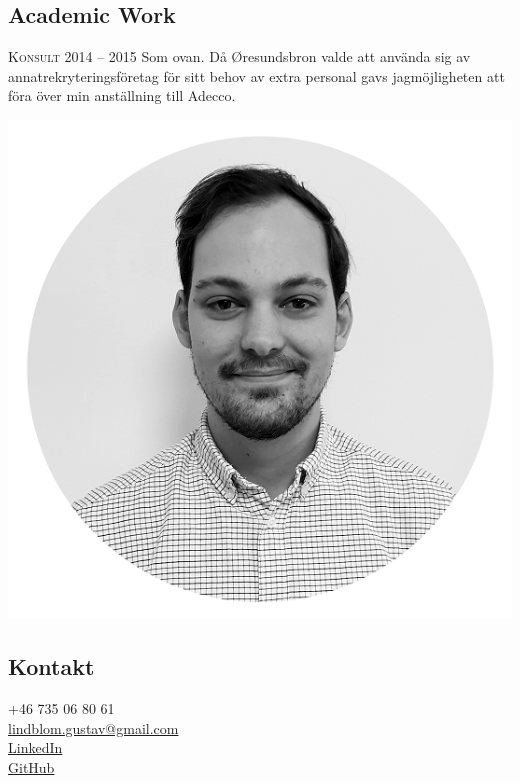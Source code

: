 \documentclass[usenames,dvipsnames]{article}
\begin{document}
\begin{minipage}[t]{0.65\textwidth}
\subsection*{\textcolor{NavyBlue}{Academic Work}}
\begin{flushleft}
\textsc{Konsult 2014 -- 2015}\break
Som ovan. Då Øresundsbron valde att använda sig av annatrekryteringsföretag för sitt behov av extra personal gavs jagmöjligheten att föra över min anställning till Adecco.
\end{flushleft}

\end{minipage}
\hspace{1.6cm}\begin{minipage}[t]{0.4\textwidth}
\vspace{0cm}
\begin{flushleft}
\begin{center}
\noindent\includegraphics[scale=0.25]{gustavlindblom}
\end{center}
\subsection*{\textcolor{NavyBlue}{Kontakt}}

\faPhone \qquad +46 735 06 80 61\\
\faEnvelope \qquad \href{mailto:lindblom.gustav@gmail.com}{lindblom.gustav@gmail.com}\\
\faLinkedin \qquad \href{https://www.linkedin.com/in/gustav-lindblom-a1529912a/}{LinkedIn}\\
\faGithub \qquad \href{https://github.com/glindblom}{GitHub}



\end{flushleft}
\end{minipage}
\end{document}

